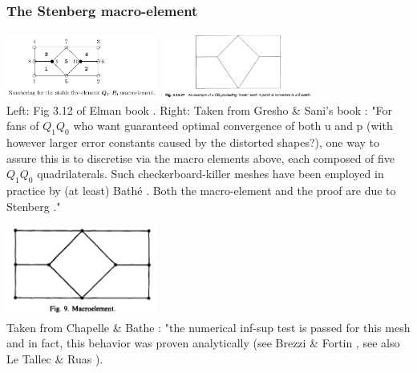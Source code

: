 
\subsubsection{The Stenberg macro-element} 

\begin{center}
\includegraphics[width=5cm]{images/meshtopos/elsw}
\includegraphics[width=5cm]{images/meshtopos/grsa}\\
{\captionfont Left: Fig 3.12 of Elman \etal book \cite{elsw}.
Right: Taken from Gresho \& Sani's book \cite{grsa}: "For fans of $Q_1Q_0$ who want 
guaranteed optimal convergence of both u and p (with however larger error 
constants caused by the distorted shapes?), one way to assure this is
to discretise via the macro elements above, each composed of five $Q_1Q_0$
quadrilaterals. Such checkerboard-killer meshes have been employed in practice
by (at least) Bath\'e \cite{chba93}. Both the macro-element and the proof are
due to Stenberg \cite{sten84}."}
\end{center}

\begin{center}
\includegraphics[width=5cm]{images/meshtopos/chba93}\\
{\captionfont Taken from Chapelle \& Bathe \cite{chba93}: "the numerical inf-sup test is passed for this mesh and in fact,
this behavior was proven analytically (see Brezzi \& Fortin \cite{brfo}, see also Le Tallec \& Ruas \cite{leru86}).}
\end{center}

